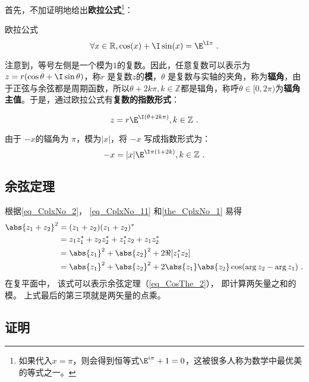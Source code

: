 首先，不加证明地给出\textbf{欧拉公式}\footnote{如果代入$x=\pi$，则会得到恒等式$\E^{i\pi}+1=0$，这被很多人称为数学中最优美的等式之一。}：

\begin{theorem}{欧拉公式}
\begin{equation}
\forall x\in\mathbb{R},\cos(x) + \I\sin(x)=\E^{\I x} ~.
\end{equation}
\end{theorem}

注意到，等号左侧是一个模为$1$的复数。因此，任意复数可以表示为 $z = r (\cos \theta + \I \sin \theta)$，称$r$ 是复数$z$的\textbf{模}，$\theta$ 是复数与实轴的夹角，称为\textbf{辐角}，由于正弦与余弦都是周期函数，所以$\theta+2k\pi,k\in\mathbb{Z}$都是辐角，称呼$\theta\in[0,2\pi)$为\textbf{辐角主值}。于是，通过欧拉公式有\textbf{复数的指数形式}：

\begin{equation}
z = r \E^{\I(\theta+2k\pi)},k\in\mathbb{Z}~.
\end{equation}

由于 $-x$的辐角为 $\pi$，模为$|x|$，将 $-x$ 写成指数形式为：
\begin{equation}
-x = |x| \E^{\I\pi(1+2k)},k\in\mathbb{Z}~.
\end{equation}


\subsection{余弦定理}
根据\autoref{eq_CplxNo_2}， \autoref{eq_CplxNo_11}  和\autoref{the_CplxNo_1} 易得
\begin{equation}
\begin{aligned}
\abs{z_1 + z_2}^2 &= (z_1 + z_2)(z_1 + z_2)^*\\
&= z_1z_1^* + z_2z_2^* + z_1^* z_2 + z_1 z_2^*\\
&= \abs{z_1}^2 + \abs{z_2}^2 + 2\Re[z_1^* z_2]\\
&= \abs{z_1}^2 + \abs{z_2}^2 + 2\abs{z_1}\abs{z_2}\cos(\arg z_2 - \arg z_1)~.
\end{aligned}
\end{equation}
在复平面中， 该式可以表示余弦定理（\autoref{eq_CosThe_2}）， 即计算两矢量之和的模。 上式最后的第三项就是两矢量的点乘。


\subsection{证明}\label{sub_CplxNo_1}

